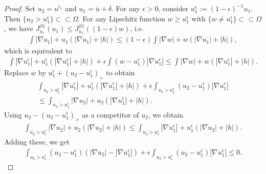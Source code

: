 \documentclass[11pt, letterpaper]{amsart}
\theoremstyle{definition}
\theoremstyle{remark}
\begin{document}
\begin{appendix}
\begin{proof}
	Set $u_2 = u ^{t_1}$ and $u_1 = \bar{u}+ \delta $. 
	For any $\epsilon >0$, consider $u_1 ^{\epsilon } := (1-\epsilon )^{-1}u_1$. Then $\{u_2 > u_1^{\epsilon }\} \subset \subset \Omega $. For any Lipschitz function $w \geq u_1 ^{\epsilon }$ with $\{w \neq u_1 ^{\epsilon }\} \subset \subset \Omega $, we have $J^{|h|}_{u_1}(u_1) \leq J^{|h|}_{u_1}( (1-\epsilon ) w)$, i.e.
	\begin{align*}
	\int |\nabla u_1| + u_1\left( |\nabla u_1| +|h| \right) \leq (1-\epsilon )\int |\nabla w| + w \left( |\nabla u_1| + |h| \right) ,
\end{align*} 
which is equivalent to
\begin{align}\label{u1eps-w}
		\int |\nabla u_1 ^{\epsilon }| + u_1 ^{\epsilon }\left( |\nabla u_1 ^{\epsilon }| + |h| \right) + \epsilon \int \left( w- u_1 ^{\epsilon } \right) |\nabla u_1 ^{\epsilon }| \leq \int |\nabla w| + w\left( |\nabla u_1 ^{\epsilon }| + |h| \right) .
	\end{align} 
	Replace $w$ by $u_1 ^{\epsilon } + (u_2- u_1 ^{\epsilon })_{+}$ to obtain
	\begin{align*}
\int_{u_2 > u_1 ^{\epsilon }} |\nabla u_1 ^{\epsilon }| + u_1 ^{\epsilon }\left( |\nabla u_1 ^{\epsilon }| + |h| \right) + \epsilon \int_{u_2> u_1 ^{\epsilon }} \left( u_2- u_1 ^{\epsilon } \right) |\nabla u_1 ^{\epsilon }| \\
\leq \int_{u_2 > u_1 ^{\epsilon }} |\nabla u_2| + u_2\left( |\nabla u_1 ^{\epsilon }| + |h| \right) .
	\end{align*} 
Using $u_2- (u_2- u_1 ^{\epsilon })_{+}$ as a competitor of $u_2$, we obtain
\begin{align*}
	\int_{u_2> u_1 ^{\epsilon }} |\nabla u_2| + u_2\left( |\nabla u_2| + |h| \right) \leq \int_{u_2> u_1 ^{\epsilon }} |\nabla u_1 ^{\epsilon } | + u_1 ^{\epsilon }\left( |\nabla u_2| + |h| \right) .
\end{align*} 
Adding these, we get
\begin{align}\label{u2-u1-ineq1}
	\int_{u_2> u_1 ^{\epsilon }} (u_2 - u_1 ^{\epsilon }) \left( |\nabla u_2| - |\nabla u_1 ^{\epsilon }| \right) + \epsilon \int_{u_2> u_1 ^{\epsilon }} \left( u_2- u_1 ^{\epsilon } \right) |\nabla u_1 ^{\epsilon }| \leq 0.
\end{align} 


\end{proof}
\end{appendix}
\end{document}
